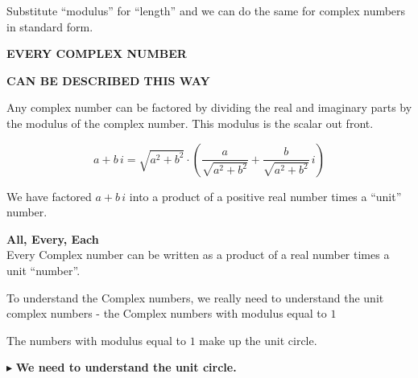 \documentclass{ximera}
\begin{document}
Substitute ``modulus'' for ``length'' and we can do the same for complex numbers in standard form. \\ 






\begin{center}

\textbf{\textcolor{purple!50!blue!90!black}{EVERY COMPLEX NUMBER}}

\textbf{\textcolor{purple!50!blue!90!black}{CAN BE DESCRIBED THIS WAY}}

\end{center}




Any complex number can be factored by dividing the real and imaginary parts by the modulus of the complex number.  This modulus is the scalar out front.




\[     a + b \, i    =  \sqrt{a^2 + b^2}  \cdot \left(  \frac{a}{\sqrt{a^2 + b^2}} + \frac{b}{\sqrt{a^2 + b^2}} \, i \right)                      \]


We have factored $a + b \, i $ into a product of a positive real number times a ``unit'' number. \\

















\begin{summary} \textbf{\textcolor{red!80!black}{All, Every, Each}}  \\

Every Complex number can be written as a product of a real number times a unit ``number''.


To understand the Complex numbers, we really need to understand the unit complex numbers - the Complex numbers with modulus equal to $1$


The numbers with modulus equal to $1$ make up the unit circle.


$\blacktriangleright$ \textbf{\textcolor{blue!55!black}{We need to understand the unit circle.}}   

\end{summary}
\end{document}
